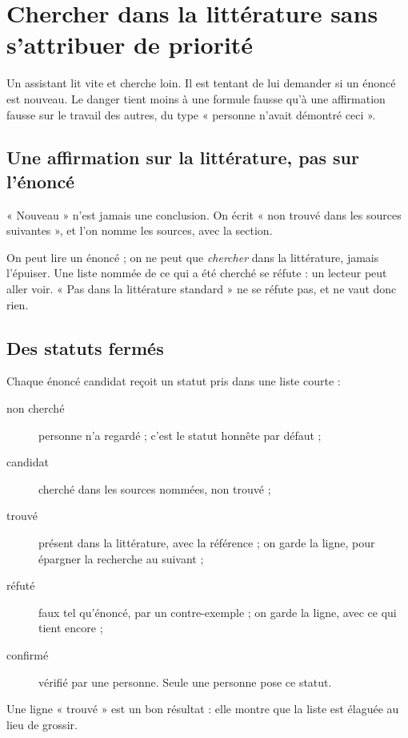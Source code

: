 \chapter{Chercher dans la littérature sans s'attribuer de priorité}\label{ch:litterature}

Un assistant lit vite et cherche loin. Il est tentant de lui demander si un énoncé est
nouveau. Le danger tient moins à une formule fausse qu'à une affirmation fausse sur le
travail des autres, du type « personne n'avait démontré ceci ».

\section{Une affirmation sur la littérature, pas sur l'énoncé}

\begin{regle}
« Nouveau » n'est jamais une conclusion. On écrit « non trouvé dans les sources
suivantes », et l'on nomme les sources, avec la section.
\end{regle}

On peut lire un énoncé ; on ne peut que \emph{chercher} dans la littérature, jamais
l'épuiser. Une liste nommée de ce qui a été cherché se réfute : un lecteur peut aller voir.
« Pas dans la littérature standard » ne se réfute pas, et ne vaut donc rien.

\section{Des statuts fermés}

Chaque énoncé candidat reçoit un statut pris dans une liste courte :
\begin{description}
  \item[non cherché] personne n'a regardé ; c'est le statut honnête par défaut ;
  \item[candidat] cherché dans les sources nommées, non trouvé ;
  \item[trouvé] présent dans la littérature, avec la référence ; on garde la ligne, pour
        épargner la recherche au suivant ;
  \item[réfuté] faux tel qu'énoncé, par un contre-exemple ; on garde la ligne, avec ce
        qui tient encore ;
  \item[confirmé] vérifié par une personne. Seule une personne pose ce statut.
\end{description}

Une ligne « trouvé » est un bon résultat : elle montre que la liste est élaguée au lieu de
grossir.

